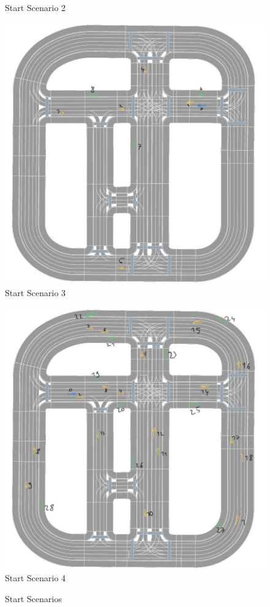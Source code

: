 \begin{figure}[ht]
\begin{minipage}[b]{0.43\linewidth}
		Start Scenario 2
	\end{minipage} 
	\begin{minipage}[b]{0.43\linewidth}
		\centering
		\includegraphics[width=1\linewidth]{figures/start_scenarios/scenario_v4} 
		Start Scenario 3
	\end{minipage}%
	\begin{minipage}[b]{0.43\linewidth}
		\centering
		\includegraphics[width=1\linewidth]{figures/start_scenarios/scenario_v5} 
		Start Scenario 4
	\end{minipage} 
	\caption{Start Scenarios}
	\label{appendix:start_scenarios} 
\end{figure}


